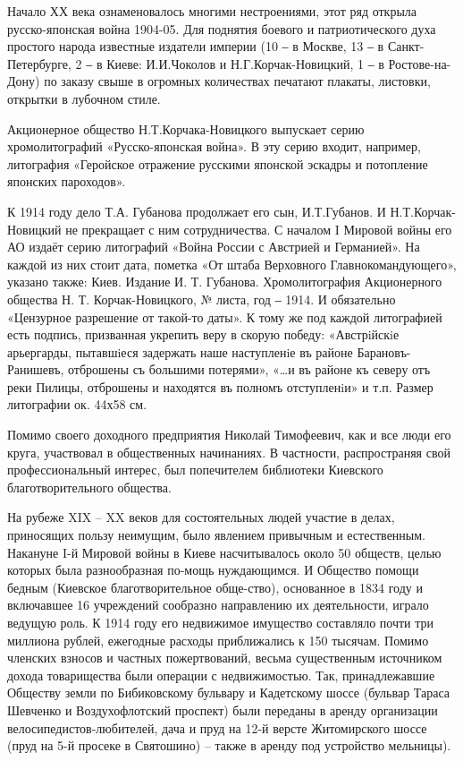 Начало ХХ века ознаменовалось многими нестроениями, этот ряд открыла
русско-японская война 1904-05. Для поднятия боевого и патриотического духа
простого народа известные издатели империи (10 ‒ в Москве, 13 ‒ в
Санкт-Петербурге, 2 ‒ в Киеве: И.И.Чоколов и Н.Г.Корчак-Новицкий, 1 ‒ в
Ростове-на-Дону) по заказу свыше в огромных количествах печатают плакаты,
листовки, открытки в лубочном стиле. 

Акционерное общество Н.Т.Корчака-Новицкого выпускает серию хромолитографий
«Русско-японская война». В эту серию входит, например, литография «Геройское
отражение русскими японской эскадры и потопление японских пароходов».

К 1914 году дело Т.А. Губанова продолжает его сын, И.Т.Губанов. И
Н.Т.Корчак-Новицкий не прекращает с ним сотрудничества. С началом I Мировой
войны его АО издаёт серию литографий «Война России с Австрией и Германией». На
каждой из них стоит дата, пометка «От штаба Верховного Главнокомандующего»,
указано также: Киев. Издание И. Т. Губанова. Хромолитография Акционерного
общества Н. Т. Корчак-Новицкого, № листа, год ‒ 1914. И обязательно «Цензурное
разрешение от такой-то даты». К тому же под каждой литографией есть подпись,
призванная укрепить веру в скорую победу: «Австрiйскiе арьергарды, пытавшiеся
задержать наше наступленiе въ районе Барановъ-Ранишевъ, отброшены съ большими
потерями», «…и въ районе къ северу отъ реки Пилицы, отброшены и находятся въ
полномъ отступленiи» и т.п. Размер литографии ок. 44х58 см.

Помимо своего доходного предприятия Николай Тимофеевич, как и все люди его
круга, участвовал в общественных начинаниях. В частности, распространяя свой
профессиональный интерес, был попечителем библиотеки Киевского
благотворительного общества. 

На рубеже XIX – XX веков для состоятельных людей участие в делах, приносящих
пользу неимущим, было явлением привычным и естественным. Накануне I-й Мировой
войны в Киеве насчитывалось около 50 обществ, целью которых была разнообразная
по-мощь нуждающимся. И Общество помощи бедным (Киевское благотворительное
обще-ство), основанное в 1834 году и включавшее 16 учреждений сообразно
направлению их деятельности, играло ведущую роль. К 1914 году его недвижимое
имущество составляло почти три миллиона рублей, ежегодные расходы приближались
к 150 тысячам. Помимо членских взносов и частных пожертвований, весьма
существенным источником дохода товарищества были операции с недвижимостью. Так,
принадлежавшие Обществу земли по Бибиковскому бульвару и Кадетскому шоссе
(бульвар Тараса Шевченко и Воздухофлотский проспект) были переданы в аренду
организации велосипедистов-любителей, дача и пруд на 12-й версте Житомирского
шоссе (пруд на 5-й просеке в Святошино) – также в аренду под устройство
мельницы).

